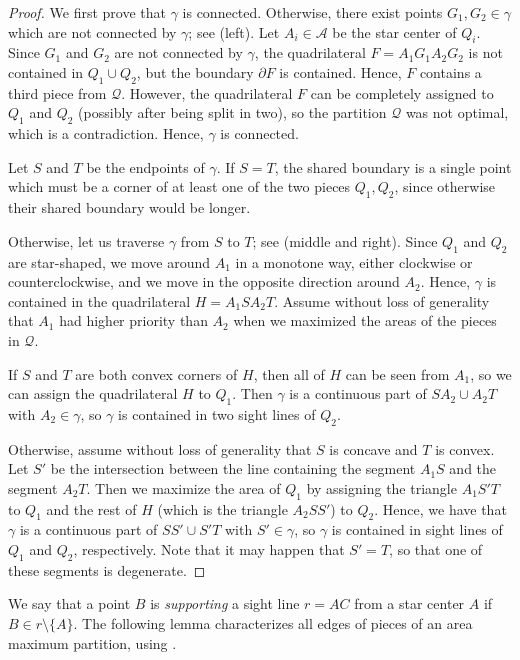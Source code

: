 \documentclass[10pt,a4paper]{article}
\begin{document}
\begin{proof}
We first prove that $\gamma$ is connected.
Otherwise, there exist points $G_1,G_2\in\gamma$ which are not connected by $\gamma$; see  (left).
Let $A_i\in\mathcal A$ be the star center of $Q_i$.
Since $G_1$ and $G_2$ are not connected by $\gamma$, the quadrilateral $F=A_1G_1A_2G_2$ is not contained in $Q_1\cup Q_2$, but the boundary $\partial F$ is contained.
Hence, $F$ contains a third piece from $\mathcal Q$.
However, the quadrilateral $F$ can be completely assigned to $Q_1$ and $Q_2$ (possibly after being split in two), so the partition $\mathcal Q$ was not optimal, which is a contradiction.
Hence, $\gamma$ is connected.

Let $S$ and $T$ be the endpoints of $\gamma$.
If $S=T$, the shared boundary is a single point which must be a corner of at least one of the two pieces $Q_1,Q_2$, since otherwise their shared boundary would be longer.

Otherwise, let us traverse $\gamma$ from $S$ to $T$; see  (middle and right).
Since $Q_1$ and $Q_2$ are star-shaped, we move around $A_1$ in a monotone way, either clockwise or counterclockwise, and we move in the opposite direction around $A_2$.
Hence, $\gamma$ is contained in the quadrilateral $H=A_1SA_2T$.
Assume without loss of generality that $A_1$ had higher priority than $A_2$ when we maximized the areas of the pieces in $\mathcal Q$.

If $S$ and $T$ are both convex corners of $H$, then all of $H$ can be seen from $A_1$, so we can assign the quadrilateral $H$ to $Q_1$. Then $\gamma$ is a continuous part of $SA_2\cup A_2T$ with $A_2 \in \gamma$, so $\gamma$ is contained in two sight lines of $Q_2$.

Otherwise, assume without loss of generality that $S$ is concave and $T$ is convex.
Let $S'$ be the intersection between the line containing the segment $A_1S$ and the segment $A_2T$.
Then we maximize the area of $Q_1$ by assigning the triangle $A_1S'T$ to $Q_1$ and the rest of $H$ (which is the triangle $A_2SS'$) to $Q_2$.
Hence, we have that $\gamma$ is a continuous part of $SS'\cup S'T$ with $S' \in \gamma$, so $\gamma$ is contained in sight lines of $Q_1$ and $Q_2$, respectively.
Note that it may happen that $S'=T$, so that one of these segments is degenerate.
\end{proof}

We say that a point $B$ is \emph{supporting} a sight line $r=AC$ from a star center $A$ if $B\in r\setminus\{A\}$.
The following lemma characterizes all edges of pieces of an area maximum partition, using .
\end{document}
